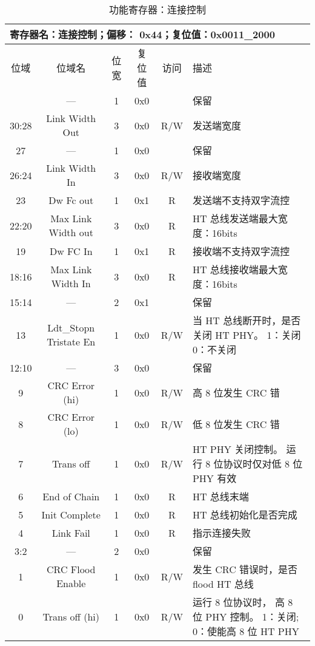 \begin{table}[htbp]
  \centering
  \begin{tabular}{|c|c|c|c|c|p{6.5cm}|} \hline
    \multicolumn{6}{|l|}{寄存器名：连接控制；偏移： 0x44；复位值：0x0011\_2000} \\ \hline
    位域  & 位域名   & 位宽 & 复位值 & 访问 & 描述 \\ \hhline
    31    & ---                  & 1 & 0x0 &     & 保留 \\
    30:28 & Link Width Out       & 3 & 0x0 & R/W &
    发送端宽度 \\
    27    & ---                  & 1 & 0x0 &     & 保留 \\
    26:24 & Link Width In        & 3 & 0x0 & R/W & 接收端宽度 \\
    23    & Dw Fc out            & 1 & 0x1 & R   & 发送端不支持双字流控 \\
    22:20 & Max Link Width out   & 3 & 0x0 & R   & HT 总线发送端最大宽度：16bits \\
    19    & Dw FC In             & 1 & 0x1 & R   & 接收端不支持双字流控 \\
    18:16 & Max Link Width In    & 3 & 0x0 & R   & HT 总线接收端最大宽度：16bits \\
    15:14 & ---                  & 2 & 0x1 &     & 保留 \\
    13    & \ptabincell{c}{Ldt\_Stopn \\ Tristate En}
                                 & 1 & 0x0 & R/W & 当 HT 总线断开时，是否关闭 HT PHY。 1：关闭 0：不关闭 \\
    12:10 & ---                  & 3 & 0x0 &     & 保留 \\
    9     & CRC Error (hi)       & 1 & 0x0 & R/W & 高 8 位发生 CRC 错 \\
    8     & CRC Error (lo)       & 1 & 0x0 & R/W & 低 8 位发生 CRC 错 \\
    7     & Trans off            & 1 & 0x0 & R/W & HT PHY 关闭控制。 运行 8 位协议时仅对低 8 位 PHY 有效 \\
    6     & End of Chain         & 1 & 0x0 & R   & HT 总线末端 \\
    5     & Init Complete        & 1 & 0x0 & R   & HT 总线初始化是否完成 \\
    4     & Link Fail            & 1 & 0x0 & R   & 指示连接失败 \\
    3:2   & ---                  & 2 & 0x0 &     & 保留 \\
    1     & CRC Flood Enable     & 1 & 0x0 & R/W & 发生 CRC 错误时，是否 flood HT 总线 \\
    0     & Trans off (hi)       & 1 & 0x0 & R/W & 运行 8 位协议时， 高 8 位
    PHY 控制。 1：关闭; 0：使能高 8 位 HT PHY \\ \hline
  \end{tabular}
  \caption{功能寄存器：连接控制}
  \label{tab:capreg2}
\end{table}

